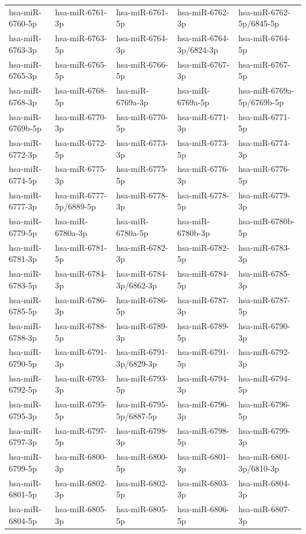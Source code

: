 \begin{longtable}{lllll}
hsa-miR-6760-5p & hsa-miR-6761-3p & hsa-miR-6761-5p & hsa-miR-6762-3p & hsa-miR-6762-5p/6845-5p \\
hsa-miR-6763-3p & hsa-miR-6763-5p & hsa-miR-6764-3p & hsa-miR-6764-3p/6824-3p & hsa-miR-6764-5p \\
hsa-miR-6765-3p & hsa-miR-6765-5p & hsa-miR-6766-5p & hsa-miR-6767-3p & hsa-miR-6767-5p \\
hsa-miR-6768-3p & hsa-miR-6768-5p & hsa-miR-6769a-3p & hsa-miR-6769a-5p & hsa-miR-6769a-5p/6769b-5p \\
hsa-miR-6769b-5p & hsa-miR-6770-3p & hsa-miR-6770-5p & hsa-miR-6771-3p & hsa-miR-6771-5p \\
hsa-miR-6772-3p & hsa-miR-6772-5p & hsa-miR-6773-3p & hsa-miR-6773-5p & hsa-miR-6774-3p \\
hsa-miR-6774-5p & hsa-miR-6775-3p & hsa-miR-6775-5p & hsa-miR-6776-3p & hsa-miR-6776-5p \\
hsa-miR-6777-3p & hsa-miR-6777-5p/6889-5p & hsa-miR-6778-3p & hsa-miR-6778-5p & hsa-miR-6779-3p \\
hsa-miR-6779-5p & hsa-miR-6780a-3p & hsa-miR-6780a-5p & hsa-miR-6780b-3p & hsa-miR-6780b-5p \\
hsa-miR-6781-3p & hsa-miR-6781-5p & hsa-miR-6782-3p & hsa-miR-6782-5p & hsa-miR-6783-3p \\
hsa-miR-6783-5p & hsa-miR-6784-3p & hsa-miR-6784-3p/6862-3p & hsa-miR-6784-5p & hsa-miR-6785-3p \\
hsa-miR-6785-5p & hsa-miR-6786-3p & hsa-miR-6786-5p & hsa-miR-6787-3p & hsa-miR-6787-5p \\
hsa-miR-6788-3p & hsa-miR-6788-5p & hsa-miR-6789-3p & hsa-miR-6789-5p & hsa-miR-6790-3p \\
hsa-miR-6790-5p & hsa-miR-6791-3p & hsa-miR-6791-3p/6829-3p & hsa-miR-6791-5p & hsa-miR-6792-3p \\
hsa-miR-6792-5p & hsa-miR-6793-3p & hsa-miR-6793-5p & hsa-miR-6794-3p & hsa-miR-6794-5p \\
hsa-miR-6795-3p & hsa-miR-6795-5p & hsa-miR-6795-5p/6887-5p & hsa-miR-6796-3p & hsa-miR-6796-5p \\
hsa-miR-6797-3p & hsa-miR-6797-5p & hsa-miR-6798-3p & hsa-miR-6798-5p & hsa-miR-6799-3p \\
hsa-miR-6799-5p & hsa-miR-6800-3p & hsa-miR-6800-5p & hsa-miR-6801-3p & hsa-miR-6801-3p/6810-3p \\
hsa-miR-6801-5p & hsa-miR-6802-3p & hsa-miR-6802-5p & hsa-miR-6803-3p & hsa-miR-6804-3p \\
hsa-miR-6804-5p & hsa-miR-6805-3p & hsa-miR-6805-5p & hsa-miR-6806-5p & hsa-miR-6807-3p \\

\end{longtable}
